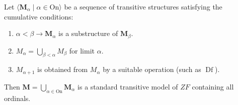 Let $\langle \mathbf{M}_\alpha \mid \alpha \in \mathrm{On} \rangle$ be a sequence of transitive structures satisfying the cumulative conditions:
\begin{enumerate}
\item $\alpha < \beta \to \mathbf{M}_\alpha$ is a substructure of $\mathbf{M}_\beta$.
\item $M_\alpha = \bigcup_{\beta < \alpha} M_\beta$ for limit $\alpha$.
\item $M_{\alpha+1}$ is obtained from $M_\alpha$ by a suitable operation (such as $\operatorname{Df}$).
\end{enumerate}
Then $\mathbf{M} = \bigcup_{\alpha \in \mathrm{On}} \mathbf{M}_\alpha$ is a standard transitive model of $ZF$ containing all ordinals.
